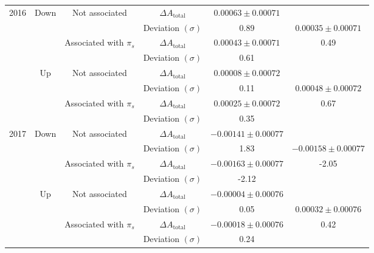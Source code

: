 \documentclass{article}
\begin{document}
\begin{center}
\begin{tabular}{c|c|c|c|c|c}
                        \multirow{8}{*}{2016} & \multirow{4}{*}{Down} & \multirow{2}{*}{Not associated} & $\Delta A_\text{total}$ & $0.00063\pm 0.00071$& \\
                        & & & Deviation $(\sigma)$ & 0.89& $0.00035\pm 0.00071$ \\
                        \cline{3-5}
                        & & \multirow{2}{*}{Associated with $\pi_s$} & $\Delta A_\text{total}$ & $0.00043\pm 0.00071$& 0.49\\
                        & & & Deviation $(\sigma)$ & 0.61& \\
                        \cline{2-6}
                        & \multirow{4}{*}{Up} & \multirow{2}{*}{Not associated} & $\Delta A_\text{total}$ & $0.00008\pm 0.00072$& \\
                        & & & Deviation $(\sigma)$ & 0.11& $0.00048\pm 0.00072$\\
                        \cline{3-5}
                        & & \multirow{2}{*}{Associated with $\pi_s$} & $\Delta A_\text{total}$ & $0.00025\pm 0.00072$& 0.67\\
                        & & & Deviation $(\sigma)$ & 0.35& \\
                        \hline

                        \multirow{8}{*}{2017} & \multirow{4}{*}{Down} & \multirow{2}{*}{Not associated} & $\Delta A_\text{total}$ & $-0.00141\pm 0.00077$& \\
                        & & & Deviation $(\sigma)$ & 1.83& $-0.00158\pm 0.00077$\\
                        \cline{3-5}
                        & & \multirow{2}{*}{Associated with $\pi_s$} & $\Delta A_\text{total}$ & $-0.00163\pm 0.00077$& -2.05\\
                        & & & Deviation $(\sigma)$ & -2.12& \\
                        \cline{2-6}
                        & \multirow{4}{*}{Up} & \multirow{2}{*}{Not associated} & $\Delta A_\text{total}$ & $-0.00004\pm 0.00076$& \\
                        & & & Deviation $(\sigma)$ & 0.05& $0.00032\pm 0.00076$\\
                        \cline{3-5}
                        & & \multirow{2}{*}{Associated with $\pi_s$} & $\Delta A_\text{total}$ & $-0.00018\pm 0.00076$& 0.42\\
                        & & & Deviation $(\sigma)$ & 0.24& \\
                        \hline


\end{tabular}
\end{center}
\end{document}
